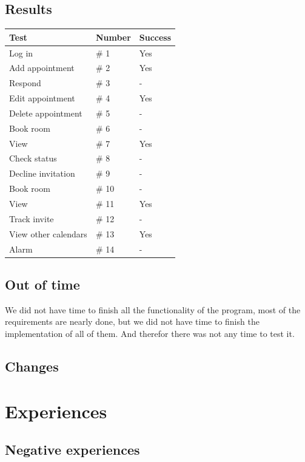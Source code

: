 \documentclass[a4paper, 10pt]{article}
\begin{document}
\subsection{Results}
\begin{tabularx}{\textwidth}{ |X|X|X| }
\hline
\rowcolor{Gray}
Test & Number & Success \\ \hline
Log in & \# 1 & Yes \\ \hline
Add appointment & \# 2 & Yes \\ \hline
Respond & \# 3 & - \\ \hline
Edit appointment & \# 4 & Yes \\ \hline
Delete appointment & \# 5 & - \\ \hline
Book room & \# 6 & - \\ \hline
View & \# 7 & Yes \\ \hline
Check status & \# 8 & -  \\ \hline
Decline invitation & \# 9 & - \\ \hline
Book room & \# 10 & - \\ \hline
View & \# 11 & Yes \\ \hline
Track invite & \# 12 & - \\ \hline
View other calendars & \# 13 & Yes \\ \hline
Alarm & \# 14  & - \\ \hline

\hline


\end{tabularx}

\subsection{Out of time}
We did not have time to finish all the functionality of the program, most of the requirements are nearly done, but we did not have time to finish the implementation of all of them. And therefor there was not any time to test it.

\subsection{Changes}

\section{Experiences}

\subsection{Negative experiences}
\end{document}
